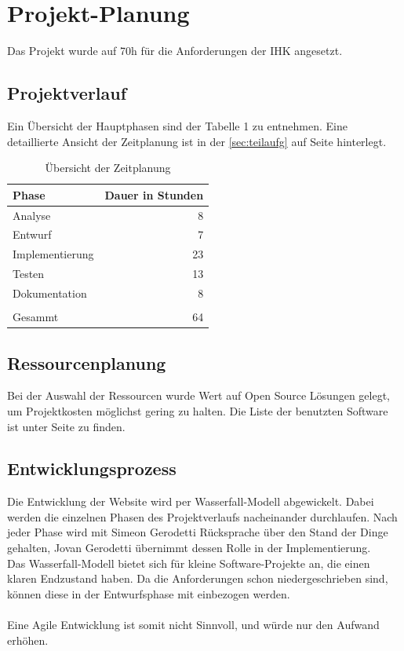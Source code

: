 \documentclass[11pt,a4paper]{article}
\begin{document}
\section{Projekt-Planung}
Das Projekt wurde auf 70h für die Anforderungen der IHK angesetzt.
\subsection{Projektverlauf}
Ein Übersicht der Hauptphasen sind der Tabelle 1 zu entnehmen. Eine detaillierte Ansicht der Zeitplanung ist in der \ref{sec:teilaufg} auf Seite \pageref{sec:teilaufg} hinterlegt.\\
\begin{table}[!ht]
  \centering
     \begin{tabular}{l|r}
       \textbf{Phase}  & \textbf{Dauer in Stunden} \\
       \hline
      Analyse       & 8                     \\
      Entwurf       & 7             	    \\
      Implementierung       & 23	\\
      Testen       & 13			         \\
       Dokumentation      &  8        \\
       \\
       \hline
       \hline
       Gesammt        & 64               \\
     \end{tabular}
     \caption{Übersicht der Zeitplanung}
\label{tbl:Übersicht der Zeitplanung}
\end{table}
\subsection{Ressourcenplanung}
Bei der Auswahl der Ressourcen wurde Wert auf Open Source Lösungen gelegt, um Projektkosten möglichst gering zu halten. Die Liste der benutzten Software ist unter Seite \pageref{sec:progs}
zu finden.
\subsection{Entwicklungsprozess}
Die Entwicklung der Website wird per Wasserfall-Modell abgewickelt. Dabei werden die einzelnen Phasen des Projektverlaufs nacheinander durchlaufen. Nach jeder Phase wird mit Simeon Gerodetti Rücksprache über den Stand der Dinge gehalten, Jovan Gerodetti übernimmt dessen Rolle in der Implementierung.\\
Das Wasserfall-Modell bietet sich für kleine Software-Projekte an, die einen klaren Endzustand haben. Da die Anforderungen schon niedergeschrieben sind, können diese in der Entwurfsphase mit einbezogen werden. \\\\
Eine Agile Entwicklung ist somit nicht Sinnvoll, und würde nur den Aufwand erhöhen.
\end{document}
